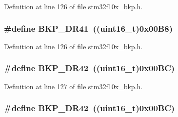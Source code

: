 Definition at line 126 of file stm32f10x\+\_\+bkp.\+h.

\subsubsection[{\texorpdfstring{B\+K\+P\+\_\+\+D\+R41}{BKP_DR41}}]{\setlength{\rightskip}{0pt plus 5cm}\#define B\+K\+P\+\_\+\+D\+R41~(({\bf uint16\+\_\+t})0x00\+B8)}\hypertarget{group___data___backup___register_gae1e184afc030987396716ddfad008e81}{}\label{group___data___backup___register_gae1e184afc030987396716ddfad008e81}


Definition at line 126 of file stm32f10x\+\_\+bkp.\+h.

\subsubsection[{\texorpdfstring{B\+K\+P\+\_\+\+D\+R42}{BKP_DR42}}]{\setlength{\rightskip}{0pt plus 5cm}\#define B\+K\+P\+\_\+\+D\+R42~(({\bf uint16\+\_\+t})0x00\+B\+C)}\hypertarget{group___data___backup___register_ga557d35e490957616b02672005f516542}{}\label{group___data___backup___register_ga557d35e490957616b02672005f516542}


Definition at line 127 of file stm32f10x\+\_\+bkp.\+h.

\subsubsection[{\texorpdfstring{B\+K\+P\+\_\+\+D\+R42}{BKP_DR42}}]{\setlength{\rightskip}{0pt plus 5cm}\#define B\+K\+P\+\_\+\+D\+R42~(({\bf uint16\+\_\+t})0x00\+B\+C)}\hypertarget{group___data___backup___register_ga557d35e490957616b02672005f516542}{}\label{group___data___backup___register_ga557d35e490957616b02672005f516542}


